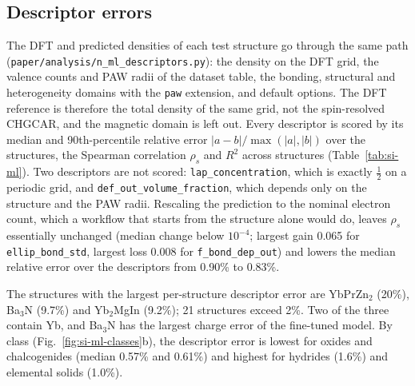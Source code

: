 \documentclass[11pt,a4paper]{article}
\begin{document}
\subsection{Descriptor errors}
The DFT and predicted densities of each test structure go through the same
path (\texttt{paper/analysis/n\_ml\_descriptors.py}): the density on the DFT
grid, the valence counts and PAW radii of the dataset table, the bonding,
structural and heterogeneity domains with the \texttt{paw} extension, and
default options. The DFT reference is therefore the total density of the
same grid, not the spin-resolved CHGCAR, and the magnetic domain is left out.
Every descriptor is scored by its median and 90th-percentile relative error
$|a-b|/\max(|a|,|b|)$ over the structures, the Spearman correlation $\rho_s$
and $R^2$ across structures (Table~\ref{tab:si-ml}). Two descriptors are not
scored: \texttt{lap\_concentration}, which is exactly $\tfrac12$ on a periodic
grid, and \texttt{def\_out\_volume\_fraction}, which depends only on the
structure and the PAW radii. Rescaling the prediction to the nominal electron
count, which a workflow that starts from the structure alone would do, leaves
$\rho_s$ essentially unchanged (median change below $10^{-4}$; largest gain
0.065 for \texttt{ellip\_bond\_std}, largest loss 0.008 for
\texttt{f\_bond\_dep\_out}) and lowers the median relative error over the
descriptors from 0.90\% to 0.83\%.

The structures with the largest per-structure descriptor error are
YbPrZn$_2$ (20\%), Ba$_3$N (9.7\%) and Yb$_2$MgIn (9.2\%); 21 structures exceed
2\%. Two of the three contain Yb, and Ba$_3$N has the largest charge error of
the fine-tuned model. By class (Fig.~\ref{fig:si-ml-classes}b), the
descriptor error is lowest for oxides and chalcogenides (median 0.57\% and
0.61\%) and highest for hydrides (1.6\%) and elemental solids (1.0\%).


\end{document}
